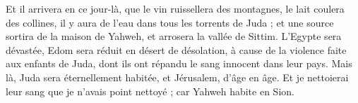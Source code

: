 \begin{multicols}{2}
Et il arrivera en ce jour-là, que le vin ruissellera des montagnes, le lait coulera des collines, il y aura de l'eau dans tous les torrents de Juda ; et une source sortira de la maison de Yahweh, et arrosera la vallée de Sittim.
L'Egypte sera dévastée, Edom sera réduit en désert de désolation, à cause de la violence faite aux enfants de Juda, dont ils ont répandu le sang innocent dans leur pays.
Mais là, Juda sera éternellement habitée, et Jérusalem, d'âge en âge.
Et je nettoierai leur sang que je n'avais point nettoyé ; car Yahweh habite en Sion.

\PPE{}
\end{multicols}
